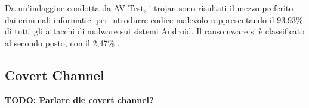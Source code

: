 Da un'indaggine condotta da AV-Test, i trojan sono risultati il mezzo preferito dai criminali informatici per introdurre codice malevolo rappresentando il 93.93\%  di tutti gli attacchi di malware sui sistemi Android. Il ransomware si è classificato al secondo posto, con il 2,47\% \cite{trojan}.

\subsection{Covert Channel}
\textbf{TODO: Parlare die covert channel?}